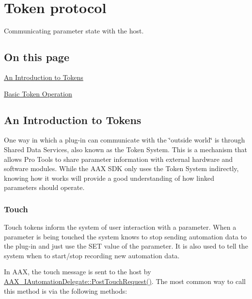 \hypertarget{a00352}{}\section{Token protocol}
\label{a00352}
Communicating parameter state with the host. 

\hypertarget{a00352_advancedTopics_parameterUpdates_tokenProtocol_contents}{}\subsection{On this page}\label{a00352_advancedTopics_parameterUpdates_tokenProtocol_contents}
\begin{DoxyItemize}
\item \hyperlink{a00352_tokenProtocol_introductionToTokens}{An Introduction to Tokens} \item \hyperlink{a00352_tokenProtocol_standardTokenOperation}{Basic Token Operation}\end{DoxyItemize}
 \hypertarget{a00352_tokenProtocol_introductionToTokens}{}\subsection{An Introduction to Tokens}\label{a00352_tokenProtocol_introductionToTokens}
One way in which a plug-\/in can communicate with the \char`\"{}outside world\char`\"{} is through Shared Data Services, also known as the Token System. This is a mechanism that allows Pro Tools to share parameter information with external hardware and software modules. While the A\+A\+X S\+D\+K only uses the Token System indirectly, knowing how it works will provide a good understanding of how linked parameters should operate.

\hypertarget{a00352_tokenProtocol_introductionToTokens_touch}{}\subsubsection{Touch}\label{a00352_tokenProtocol_introductionToTokens_touch}
Touch tokens inform the system of user interaction with a parameter. When a parameter is being touched the system knows to stop sending automation data to the plug-\/in and just use the S\+E\+T value of the parameter. It is also used to tell the system when to start/stop recording new automation data.

In A\+A\+X, the touch message is sent to the host by \hyperlink{a00086_a30fdb67042b8dc9fb42fa9023ed9cce0}{A\+A\+X\+\_\+\+I\+Automation\+Delegate\+::\+Post\+Touch\+Request()}. The most common way to call this method is via the following methods\+:


